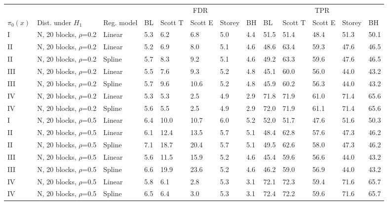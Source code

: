 \documentclass{article}\usepackage[]{graphicx}\usepackage[]{color}
\begin{document}
  
\begin{table}[ht]
\centering
\begin{tabular}{lll|lllll|lllll}
  \hline
  &&& \multicolumn{5}{c}{FDR} & \multicolumn{5}{c}{TPR}\\
 $\pi_0(x)$ &  Dist. under $H_1$ & Reg. model & BL & Scott T & Scott E & Storey & BH & BL & Scott T & Scott E & Storey & BH    \\
 \hline
I & N, 20 blocks, $\rho$=0.2 & Linear & 5.3 & 6.2 & 6.8 & 5.0 & 4.4 & 51.5 & 51.4 & 48.4 & 51.3 & 50.1 \\ 
  II & N, 20 blocks, $\rho$=0.2 & Linear & 5.2 & 6.9 & 8.0 & 5.1 & 4.6 & 48.6 & 63.4 & 59.3 & 47.6 & 46.5 \\ 
  II & N, 20 blocks, $\rho$=0.2 & Spline & 5.7 & 8.3 & 9.2 & 5.1 & 4.6 & 49.2 & 63.3 & 59.6 & 47.6 & 46.5 \\ 
  III & N, 20 blocks, $\rho$=0.2 & Linear & 5.5 & 7.6 & 9.3 & 5.2 & 4.8 & 45.1 & 60.0 & 56.0 & 44.0 & 43.2 \\ 
  III & N, 20 blocks, $\rho$=0.2 & Spline & 5.7 & 9.6 & 10.6 & 5.2 & 4.8 & 45.9 & 60.2 & 56.3 & 44.0 & 43.2 \\ 
  IV & N, 20 blocks, $\rho$=0.2 & Linear & 5.3 & 5.3 & 2.5 & 4.9 & 2.9 & 71.8 & 71.9 & 61.0 & 71.4 & 65.6 \\ 
  IV & N, 20 blocks, $\rho$=0.2 & Spline & 5.6 & 5.5 & 2.5 & 4.9 & 2.9 & 72.0 & 71.9 & 61.1 & 71.4 & 65.6 \\ 
   \hline
I & N, 20 blocks, $\rho$=0.5 & Linear & 6.4 & 10.0 & 10.7 & 6.0 & 5.2 & 52.0 & 51.7 & 47.6 & 51.6 & 50.3 \\ 
  II & N, 20 blocks, $\rho$=0.5 & Linear & 6.1 & 12.4 & 13.5 & 5.7 & 5.1 & 48.4 & 62.8 & 57.6 & 47.3 & 46.2 \\ 
  II & N, 20 blocks, $\rho$=0.5 & Spline & 7.1 & 18.7 & 20.4 & 5.7 & 5.1 & 49.5 & 62.6 & 58.0 & 47.3 & 46.2 \\ 
  III & N, 20 blocks, $\rho$=0.5 & Linear & 5.6 & 11.5 & 15.9 & 5.2 & 4.6 & 45.4 & 59.6 & 56.6 & 44.0 & 43.2 \\ 
  III & N, 20 blocks, $\rho$=0.5 & Spline & 6.6 & 19.9 & 23.6 & 5.2 & 4.6 & 46.2 & 59.0 & 56.9 & 44.0 & 43.2 \\ 
  IV & N, 20 blocks, $\rho$=0.5 & Linear & 5.8 & 6.1 & 2.8 & 5.3 & 3.1 & 72.1 & 72.3 & 59.4 & 71.6 & 65.7 \\ 
  IV & N, 20 blocks, $\rho$=0.5 & Spline & 6.5 & 6.4 & 3.0 & 5.3 & 3.1 & 72.4 & 72.2 & 59.6 & 71.6 & 65.7 \\ 

\end{tabular}
\end{table}
\end{document}
